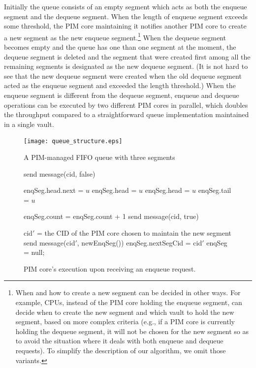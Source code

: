 Initially the queue consists of an empty segment which acts as both the enqueue segment and 
the dequeue segment. 
When the length of enqueue segment exceeds some threshold, the PIM core maintaining it
notifies another PIM core to create a new segment as the new enqueue segment.\footnote{
When and how to create a new segment can be decided in other ways.
For example, CPUs, instead of the PIM core holding the enqueue segment, 
can decide when to create the new segment and which vault to hold the new segment, 
based on more complex criteria 
(e.g., if a PIM core is currently holding the dequeue segment, it will not be chosen for 
the new segment so as to avoid the situation where it deals with both enqueue and dequeue requests).
To simplify the description of our algorithm, we omit those variants.}
When the dequeue segment becomes empty and the queue has one than one segment at the moment, 
the dequeue segment is deleted and the segment that were created first 
among all the remaining segments is designated as the new dequeue segment. 
(It is not hard to see that the new dequeue segment were created when the old dequeue segment 
acted as the enqueue segment and exceeded the length threshold.)
When the enqueue segment is different from the dequeue segment, 
enqueue and dequeue operations can be executed by two different PIM cores 
in parallel, which doubles the throughput compared to a straightforward queue implementation 
maintained in a single vault.  

\begin{figure}[ht!]
\centering
\texttt{[image: queue\_structure.eps]}
\caption{A PIM-managed FIFO queue with three segments}
\label{figure:queue_structure}
\end{figure}



\begin{figure}
\begin{algorithm}[H]
\Begin
{
    {
        send message(cid, false)\;
    }
    {
        {
            enqSeg.head.next = $u$\;
            enqSeg.head = $u$\;
        }
        {
            enqSeg.head = $u$\;
            enqSeg.tail = $u$\;
        }

        enqSeg.count = enqSeg.count + 1\;
        send message(cid, true)\;

        {
            cid$'$ = the CID of the PIM core chosen to maintain the new segment\;
            send message(cid$'$, newEnqSeg())\;
            enqSeg.nextSegCid = cid$'$\;
            enqSeg = null;
        }
    }
}
\end{algorithm}
\caption{PIM core's execution upon receiving an enqueue request.}
\label{figure:enq}
\end{figure}

